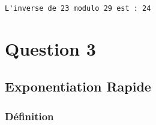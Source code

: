 \documentclass{report}
\newenvironment{code}%
   {\snugshade}%
   {\endsnugshade}
\begin{document}
   \begin{code}\begin{Verbatim}[commandchars=\\\{\}]
L'inverse de 23 modulo 29 est : 24

    \end{Verbatim}
\end{code}

\section{\texorpdfstring{\textbf{Question
3}}{Question 3}}\label{question-3}

\subsection{\texorpdfstring{\textbf{Exponentiation
Rapide}}{Exponentiation Rapide}}\label{exponentiation-rapide}

\subsubsection{\texorpdfstring{\textbf{Définition}}{Définition}}\label{duxe9finition}
\end{document}
